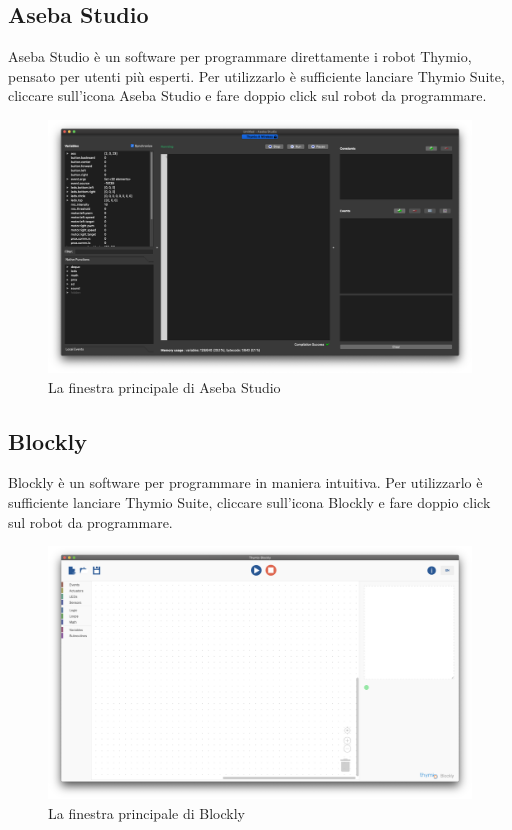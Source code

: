 \documentclass[12pt]{article}
\begin{document}
	\newpage
		
	\subsection{Aseba Studio}
	
		Aseba Studio è un software per programmare direttamente i robot Thymio, pensato per utenti più esperti. Per utilizzarlo è sufficiente lanciare Thymio Suite, cliccare sull'icona Aseba Studio e fare doppio click sul robot da programmare.
		
		\begin{figure}[H]
			\includegraphics[width=\textwidth]{img/asebaStudio.png}
			\caption{La finestra principale di Aseba Studio}
			\label{main_aseba}
		\end{figure}		
		
	\newpage

	\subsection{Blockly}

		Blockly è un software per programmare in maniera intuitiva. Per utilizzarlo è sufficiente lanciare Thymio Suite, cliccare sull'icona Blockly e fare doppio click sul robot da programmare.
		
		\begin{figure}[H]
			\includegraphics[width=\textwidth]{img/blockly.png}
			\caption{La finestra principale di Blockly}
			\label{main_blockly}
		\end{figure}
		
\end{document}
